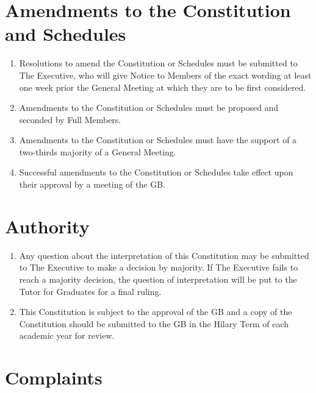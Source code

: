 \documentclass[11pt, a4paper]{article}
\begin{document}
\section{Amendments to the Constitution and Schedules}
\label{sec:amendment}

\begin{enumerate}
	\item Resolutions to amend the Constitution or Schedules must be submitted to The Executive, who will give Notice to Members of the exact wording at least one week prior the General Meeting at which they are to be first considered.
    \item Amendments to the Constitution or Schedules must be proposed and seconded by Full Members.
    \item Amendments to the Constitution or Schedules must have the support of a two-thirds majority of a General Meeting.
    \item Successful amendments to the Constitution or Schedules take effect upon their approval by a meeting of the GB.
\end{enumerate}





\section{Authority}
\label{sec:authority}

\begin{enumerate}
	\item Any question about the interpretation of this Constitution may be submitted to The Executive to make a decision by majority. If The Executive fails to reach a majority decision, the question of interpretation will be put to the Tutor for Graduates for a final ruling.
    \item This Constitution is subject to the approval of the GB and a copy of the Constitution should be submitted to the GB in the Hilary Term of each academic year for review.
\end{enumerate}





\section{Complaints}
\label{sec:complaints}
\end{document}
